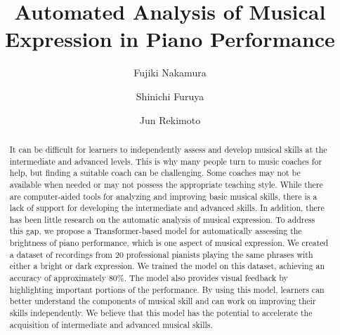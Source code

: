 \documentclass[manuscript,review,anonymous]{acmart}
\begin{document}
\title{Automated Analysis of Musical Expression in Piano Performance}

\author{Fujiki Nakamura}

\author{Shinichi Furuya}

\author{Jun Rekimoto}


\renewcommand{\shortauthors}{Nakamura et al.}

\renewcommand{\figurename}{Figure.}

\begin{abstract}
  It can be difficult for learners to independently assess and develop musical skills at the intermediate and advanced levels.
  This is why many people turn to music coaches for help, but finding a suitable coach can be challenging. 
  Some coaches may not be available when needed or may not possess the appropriate teaching style. 
  While there are computer-aided tools for analyzing and improving basic musical skills, there is a lack of support for developing the intermediate and advanced skills. 
  In addition, there has been little research on the automatic analysis of musical expression.
  To address this gap, we propose a Transformer-based model for automatically assessing the brightness of piano performance, which is one aspect of musical expression. 
  We created a dataset of recordings from 20 professional pianists playing the same phrases with either a bright or dark expression. 
  We trained the model on this dataset, achieving an accuracy of approximately 80\%. 
  The model also provides visual feedback by highlighting important portions of the performance. 
  By using this model, learners can better understand the components of musical skill and can work on improving their skills independently. 
  We believe that this model has the potential to accelerate the acquisition of intermediate and advanced musical skills.
\end{abstract}
\end{document}
